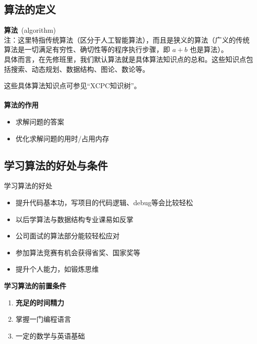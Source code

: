 \documentclass{beamer}
\begin{document}
\subsection{算法的定义}
\begin{frame}
    \begin{chdefinition}
        \textbf{算法}\ (algorithm)\\
        {\footnotesize 注：这里特指传统算法（区分于人工智能算法），而且是狭义的算法（广义的传统算法是一切满足有穷性、确切性等的程序执行步骤，即 $a+b$ 也是算法）。}\\
        具体而言，在先修班里，我们默认算法就是具体算法知识点的总和。这些知识点包括搜索、动态规划、数据结构、图论、数论等。
    \end{chdefinition}
    {\footnotesize 这些具体算法知识点可参见“XCPC知识树”。}\\~\\
    \large{\textbf{\color[RGB]{250, 148, 27}算法的作用}}\\
    \begin{itemize}
        \item 求解问题的答案
        \item 优化求解问题的用时/占用内存
    \end{itemize}
\end{frame}

\subsection{学习算法的好处与条件}
\begin{frame}
    \begin{block}{学习算法的好处}
        \begin{itemize}
            \item 提升代码基本功，写项目的代码逻辑、debug等会比较轻松
            \item 以后学算法与数据结构专业课易如反掌
            \item 公司面试的算法部分能较轻松应对
            \item 参加算法竞赛有机会获得省奖、国家奖等
            \item 提升个人能力，如锻炼思维
        \end{itemize}
    \end{block}
    \pause
    \large{\textbf{\color[RGB]{218, 76, 21}学习算法的前置条件}}\\
    \begin{enumerate}
        \item \textbf{充足的时间精力}
        \item 掌握一门编程语言
        \item 一定的数学与英语基础
    \end{enumerate}
\end{frame}
\end{document}
